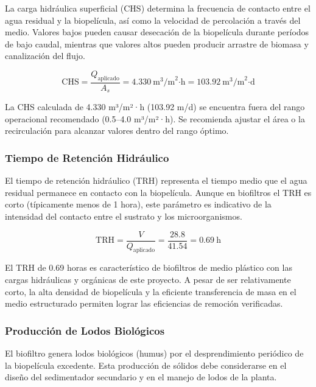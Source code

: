 \documentclass[12pt,a4paper]{article}
\begin{document}
La carga hidráulica superficial (CHS) determina la frecuencia de contacto entre el agua residual y la biopelícula, así como la velocidad de percolación a través del medio. Valores bajos pueden causar desecación de la biopelícula durante períodos de bajo caudal, mientras que valores altos pueden producir arrastre de biomasa y canalización del flujo.

\begin{equation}
\text{CHS} = \frac{Q_{\text{aplicado}}}{A_s} = 4.330\ \text{m}^3\text{/m}^2\text{·h} = 103.92\ \text{m}^3\text{/m}^2\text{·d}
\end{equation}

La CHS calculada de 4.330 m³/m²·h (103.92 m/d) se encuentra fuera del rango operacional recomendado (0.5--4.0 m³/m²·h). Se recomienda ajustar el área o la recirculación para alcanzar valores dentro del rango óptimo.

\subsubsection*{Tiempo de Retención Hidráulico}

El tiempo de retención hidráulico (TRH) representa el tiempo medio que el agua residual permanece en contacto con la biopelícula. Aunque en biofiltros el TRH es corto (típicamente menos de 1 hora), este parámetro es indicativo de la intensidad del contacto entre el sustrato y los microorganismos.

\begin{equation}
\text{TRH} = \frac{V}{Q_{\text{aplicado}}} = \frac{28.8}{41.54} = 0.69\ \text{h}
\end{equation}

El TRH de 0.69 horas es característico de biofiltros de medio plástico con las cargas hidráulicas y orgánicas de este proyecto. A pesar de ser relativamente corto, la alta densidad de biopelícula y la eficiente transferencia de masa en el medio estructurado permiten lograr las eficiencias de remoción verificadas.

\subsubsection*{Producción de Lodos Biológicos}

El biofiltro genera lodos biológicos (humus) por el desprendimiento periódico de la biopelícula excedente. Esta producción de sólidos debe considerarse en el diseño del sedimentador secundario y en el manejo de lodos de la planta.
\end{document}
